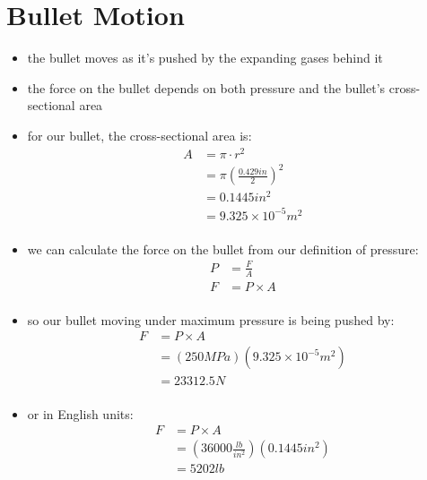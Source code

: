 \documentclass[11pt, oneside]{article}   	%
\begin{document}
\section{Bullet Motion}
\begin{itemize}
\item the bullet moves as it's pushed by the expanding gases behind it
\item the force on the bullet depends on both pressure and the bullet's cross-sectional area
\item for our bullet, the cross-sectional area is:
\begin{equation} 
\begin{split}
 A &= \pi \cdot r^{2} \\
    &= \pi (\frac{0.429 in}{2})^{2} \\
    &= 0.1445 in^{2} \\
    &= 9.325 \times 10^{-5} m^{2} \\
\end{split}
 \end{equation}
\item we can calculate the force on the bullet from our definition of pressure:
\begin{equation} 
\begin{split}
P &= \frac{F}{A} \\
F &= P \times A \\
\end{split}
 \end{equation}
\item so our bullet moving under maximum pressure is being pushed by:
\begin{equation} 
\begin{split}
F &= P \times A\\
   &= (250 MPa) (9.325 \times 10^{-5} m^{2}) \\
   &= 23312.5 N\\
\end{split}
\end{equation}

\item or in English units:
\begin{equation} 
\begin{split}
F &= P \times A\\
   &= (36000 \frac{lb}{in^{2}})  (0.1445 in^{2}) \\
   &= 5202 lb \\
\end{split}
\end{equation}
 

\end{itemize}
\end{document}
